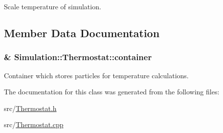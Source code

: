 Scale temperature of simulation. 



\subsection{Member Data Documentation}
\hypertarget{classSimulation_1_1Thermostat_a7625bc9f97f3b385ec28a4e049898032}{
\subsubsection[{container}]{\& Simulation\-::\-Thermostat\-::container\hspace{0.3cm}{\ttfamily [private]}}}\label{classSimulation_1_1Thermostat_a7625bc9f97f3b385ec28a4e049898032}


Container which stores particles for temperature calculations. 



The documentation for this class was generated from the following files\-:\begin{DoxyCompactItemize}
\item 
src/\hyperlink{Thermostat_8h}{Thermostat.\-h}\item 
src/\hyperlink{Thermostat_8cpp}{Thermostat.\-cpp}\end{DoxyCompactItemize}
